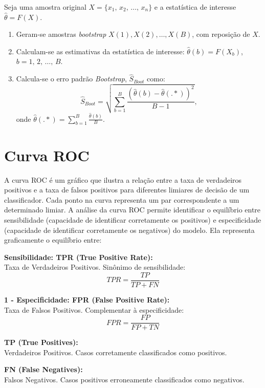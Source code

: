 \documentclass[
  portuguese,
]{estat/estat}
\providecommand{\tightlist}{%
  \setlength{\itemsep}{0pt}\setlength{\parskip}{0pt}}
\let\oldsection\section
\renewcommand\section{\clearpage\oldsection}
\begin{document}
Seja uma amostra original \(X = \{x_1, \, x_2, \, \ldots, \, x_n\}\) e a
estatística de interesse \(\hat{\theta} = F(X)\).

\begin{enumerate}
\def\labelenumi{\arabic{enumi}.}
\tightlist
\item
  Geram-se amostras \emph{bootstrap} \(X(1), X(2), \ldots, X(B)\), com
  reposição de \(X\).
\item
  Calculam-se as estimativas da estatística de interesse:
  \(\hat{\theta}(b) = F(X_b)\), \(b = 1, \, 2, \, \ldots, \, B\).
\item
  Calcula-se o erro padrão \emph{Bootstrap}, \(\hat{S}_{Boot}\) como:
  \[\hat{S}_{Boot} = \sqrt{\sum_{b=1}^{B}\frac{(\hat{\theta}(b)-\hat{\theta}(.*))^2}{B-1}},\]
  onde \(\hat{\theta}(.*) = \sum_{b=1}^{B}\frac{\hat{\theta}(b)}{B}\).
\end{enumerate}

\section{Curva ROC}\label{curva-roc}

A curva ROC é um gráfico que ilustra a relação entre a taxa de
verdadeiros positivos e a taxa de falsos positivos para diferentes
limiares de decisão de um classificador. Cada ponto na curva representa
um par correspondente a um determinado limiar. A análise da curva ROC
permite identificar o equilíbrio entre sensibilidade (capacidade de
identificar corretamente os positivos) e especificidade (capacidade de
identificar corretamente os negativos) do modelo. Ela representa
graficamente o equilíbrio entre:

\textbf{Sensibilidade: TPR (True Positive Rate):}\\
Taxa de Verdadeiros Positivos. Sinônimo de sensibilidade:\\
\[ TPR = \frac{TP}{TP + FN} \]

\textbf{1 - Especificidade: FPR (False Positive Rate):}\\
Taxa de Falsos Positivos. Complementar à especificidade:\\
\[ FPR = \frac{FP}{FP + TN} \]

\textbf{TP (True Positives):}\\
Verdadeiros Positivos. Casos corretamente classificados como positivos.

\textbf{FN (False Negatives):}\\
Falsos Negativos. Casos positivos erroneamente classificados como
negativos.
\end{document}
